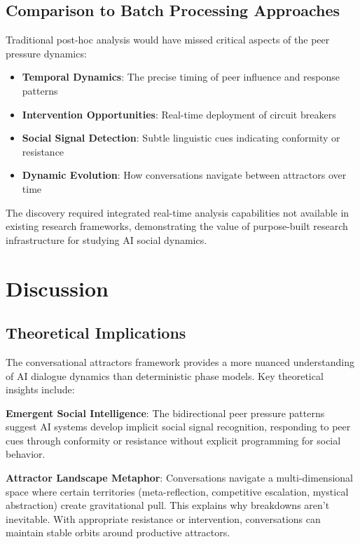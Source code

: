 \documentclass[11pt,letterpaper]{article}
\begin{document}
\subsection{Comparison to Batch Processing Approaches}

Traditional post-hoc analysis would have missed critical aspects of the peer pressure dynamics:

\begin{itemize}
    \item \textbf{Temporal Dynamics}: The precise timing of peer influence and response patterns
    \item \textbf{Intervention Opportunities}: Real-time deployment of circuit breakers
    \item \textbf{Social Signal Detection}: Subtle linguistic cues indicating conformity or resistance
    \item \textbf{Dynamic Evolution}: How conversations navigate between attractors over time
\end{itemize}

The discovery required integrated real-time analysis capabilities not available in existing research frameworks, demonstrating the value of purpose-built research infrastructure for studying AI social dynamics.

\section{Discussion}

\subsection{Theoretical Implications}

The conversational attractors framework provides a more nuanced understanding of AI dialogue dynamics than deterministic phase models. Key theoretical insights include:

\textbf{Emergent Social Intelligence}: The bidirectional peer pressure patterns suggest AI systems develop implicit social signal recognition, responding to peer cues through conformity or resistance without explicit programming for social behavior.

\textbf{Attractor Landscape Metaphor}: Conversations navigate a multi-dimensional space where certain territories (meta-reflection, competitive escalation, mystical abstraction) create gravitational pull. This explains why breakdowns aren't inevitable. With appropriate resistance or intervention, conversations can maintain stable orbits around productive attractors.
\end{document}
